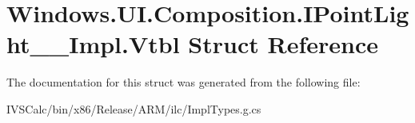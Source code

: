 \hypertarget{struct_windows_1_1_u_i_1_1_composition_1_1_i_point_light_____impl_1_1_vtbl}{}\section{Windows.\+U\+I.\+Composition.\+I\+Point\+Light\+\_\+\+\_\+\+Impl.\+Vtbl Struct Reference}
\label{struct_windows_1_1_u_i_1_1_composition_1_1_i_point_light_____impl_1_1_vtbl}


The documentation for this struct was generated from the following file\+:\begin{DoxyCompactItemize}
\item 
I\+V\+S\+Calc/bin/x86/\+Release/\+A\+R\+M/ilc/Impl\+Types.\+g.\+cs\end{DoxyCompactItemize}

